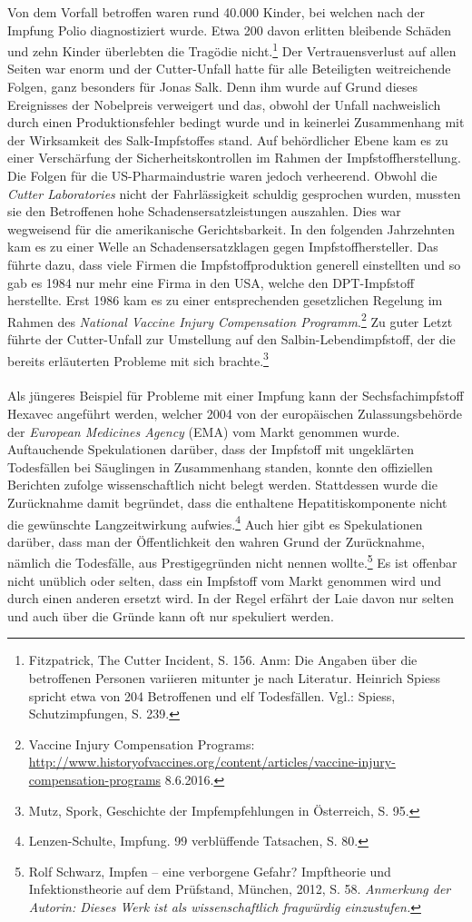 \documentclass[
    a4paper,
    12pt,
    hyphens,
    chapterprefix=true,
    headheight=33pt,
    footheight=29pt,
    headings=optiontohead, %
]{scrartcl}
\begin{document}
Von dem Vorfall betroffen waren rund 40.000 Kinder, bei welchen nach der Impfung Polio diagnostiziert wurde. Etwa 200
davon erlitten bleibende Schäden und zehn Kinder überlebten die Tragödie nicht.\footnote{Fitzpatrick, The Cutter Incident, S. 156. Anm: Die Angaben über die betroffenen Personen variieren mitunter je nach Literatur. Heinrich Spiess spricht etwa von 204 Betroffenen und elf Todesfällen. Vgl.: Spiess, Schutzimpfungen, S. 239.}
Der Vertrauensverlust auf allen Seiten war enorm und der Cutter-Unfall hatte für alle Beteiligten weitreichende Folgen,
ganz besonders für Jonas Salk. Denn ihm wurde auf Grund dieses Ereignisses der Nobelpreis verweigert und das, obwohl der Unfall
nachweislich durch einen Produktionsfehler bedingt wurde und in keinerlei Zusammenhang mit der Wirksamkeit des Salk-Impfstoffes stand.
Auf behördlicher Ebene kam es zu einer Verschärfung der Sicherheitskontrollen im Rahmen der Impfstoffherstellung.
Die Folgen für die US-Pharmaindustrie waren jedoch verheerend. Obwohl die \textit{Cutter Laboratories} nicht der Fahrlässigkeit
schuldig gesprochen wurden, mussten sie den Betroffenen hohe Schadensersatzleistungen auszahlen. Dies war wegweisend für die amerikanische Gerichtsbarkeit. In den folgenden Jahrzehnten kam es zu einer Welle an Schadensersatzklagen gegen Impfstoffhersteller.
Das führte dazu, dass viele Firmen die Impfstoffproduktion generell einstellten und so gab es 1984 nur mehr eine Firma in den USA, welche den DPT-Impfstoff herstellte. Erst 1986 kam es zu einer entsprechenden gesetzlichen Regelung im Rahmen des
\textit{National Vaccine Injury Compensation Programm}.\footnote{Vaccine Injury Compensation Programs: \url{http://www.historyofvaccines.org/content/articles/vaccine-injury-compensation-programs} 8.6.2016.}
Zu guter Letzt führte der Cutter-Unfall zur Umstellung auf den Salbin-Lebendimpfstoff, der die bereits erläuterten Probleme
mit sich brachte.\footnote{Mutz, Spork, Geschichte der Impfempfehlungen in Österreich, S. 95.}\\
\\
Als jüngeres Beispiel für Probleme mit einer Impfung kann der Sechsfachimpfstoff Hexavec angeführt werden, welcher 2004 von der europäischen Zulassungsbehörde der \textit{European Medicines Agency} (EMA) vom Markt genommen wurde. Auftauchende Spekulationen darüber, dass der Impfstoff mit ungeklärten Todesfällen bei Säuglingen in Zusammenhang standen, konnte den offiziellen Berichten zufolge wissenschaftlich nicht belegt werden. Stattdessen wurde die Zurücknahme damit begründet, dass die enthaltene Hepatitiskomponente nicht die gewünschte Langzeitwirkung aufwies.\footnote{Lenzen-Schulte, Impfung. 99 verblüffende Tatsachen, S. 80.} Auch hier gibt es Spekulationen darüber, dass man der Öffentlichkeit den wahren Grund der Zurücknahme, nämlich die Todesfälle, aus Prestigegründen nicht nennen wollte.\footnote{Rolf Schwarz, Impfen -- eine verborgene Gefahr? Impftheorie und Infektionstheorie auf dem Prüfstand, München, 2012, S. 58. \textit{Anmerkung der Autorin: Dieses Werk ist als wissenschaftlich fragwürdig einzustufen.}} Es ist offenbar nicht unüblich oder selten, dass ein Impfstoff vom Markt genommen wird und durch einen anderen ersetzt wird. In der Regel erfährt der Laie davon nur selten und auch über die Gründe kann oft nur spekuliert werden.
\end{document}
